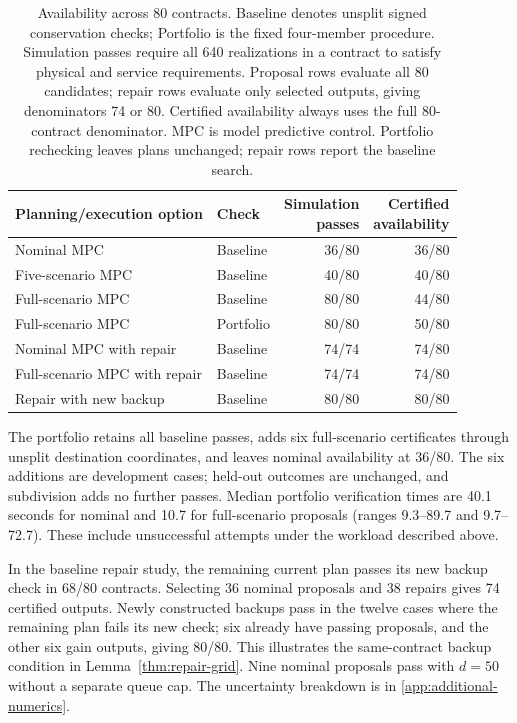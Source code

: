 \documentclass[preprint,12pt]{elsarticle}
\theoremstyle{definition}
\theoremstyle{plain}
\theoremstyle{definition}
\theoremstyle{plain}
\newcommand{\appref}[1]{\ref{#1}}
\begin{document}
\begin{table}[!htbp]
\centering\small
\caption{Availability across 80 contracts. Baseline denotes unsplit signed
conservation checks; Portfolio is the fixed four-member procedure.
Simulation passes require all 640 realizations in a contract to satisfy
physical and service requirements. Proposal rows evaluate all 80 candidates;
repair rows evaluate only selected outputs, giving denominators 74 or 80.
Certified availability always uses the full 80-contract denominator.
MPC is model predictive control. Portfolio rechecking leaves plans unchanged;
repair rows report the baseline search.}
\label{tab:benchmark-deadlines}
\label{tab:fixed-portfolio}
\begin{tabularx}{\linewidth}{@{}Xlrr@{}}
\toprule
Planning/execution option & Check & \shortstack{Simulation\\passes} & \shortstack{Certified\\availability}\\
\midrule
Nominal MPC & Baseline & 36/80 & 36/80\\
Five-scenario MPC & Baseline & 40/80 & 40/80\\
Full-scenario MPC & Baseline & 80/80 & 44/80\\
Full-scenario MPC & Portfolio & 80/80 & 50/80\\
Nominal MPC with repair & Baseline & 74/74 & 74/80\\
Full-scenario MPC with repair & Baseline & 74/74 & 74/80\\
Repair with new backup & Baseline & 80/80 & 80/80\\
\bottomrule
\end{tabularx}
\end{table}

The portfolio retains all baseline passes, adds six full-scenario
certificates through unsplit destination coordinates, and leaves nominal
availability at 36/80. The six additions are development cases; held-out
outcomes are unchanged, and subdivision adds no further passes.
Median portfolio verification times are 40.1 seconds for nominal and
10.7 for full-scenario proposals (ranges 9.3--89.7 and 9.7--72.7).
These include unsuccessful attempts under the workload described above.

In the baseline repair study, the remaining current plan passes its new
backup check in 68/80 contracts. Selecting 36 nominal proposals and 38
repairs gives 74 certified outputs. Newly constructed backups pass in
the twelve cases where the remaining plan fails its new check; six already
have passing proposals, and the other six gain outputs, giving 80/80.
This illustrates the same-contract backup condition in
Lemma~\ref{thm:repair-grid}. Nine nominal proposals pass with $d=50$
without a separate queue cap. The uncertainty breakdown is in
\appref{app:additional-numerics}.
\end{document}
